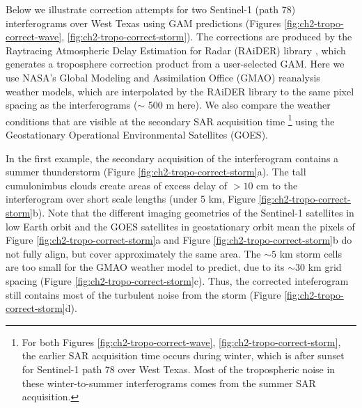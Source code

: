 Below we illustrate correction attempts for two Sentinel-1 (path 78) interferograms over West Texas using GAM predictions (Figures \ref{fig:ch2-tropo-correct-wave}, \ref{fig:ch2-tropo-correct-storm}). 
The corrections are produced by the Raytracing Atmospheric Delay Estimation for Radar (RAiDER) library \citep{Maurer2021RaiderRaytracingAtmospheric}, which generates a troposphere correction product from a user-selected GAM. Here we use NASA's Global Modeling and Assimilation Office (GMAO) reanalysis weather models, which are interpolated by the RAiDER library to the same pixel spacing as the interferograms ($\sim$ 500 m here). We also compare the weather conditions that are visible at the secondary SAR acquisition time \footnote{For both Figures \ref{fig:ch2-tropo-correct-wave}, \ref{fig:ch2-tropo-correct-storm}, the earlier SAR acquisition time occurs during winter, which is after sunset for Sentinel-1 path 78 over West Texas. Most of the tropospheric noise in these winter-to-summer interferograms comes from the summer SAR acquisition.} using the Geostationary Operational Environmental Satellites (GOES).

In the first example, the secondary acquisition of the interferogram contains a summer thunderstorm (Figure \ref{fig:ch2-tropo-correct-storm}a). The tall cumulonimbus clouds create areas of excess delay of $>10$ cm to the interferogram over short scale lengths (under 5 km, Figure \ref{fig:ch2-tropo-correct-storm}b). 
Note that the different imaging geometries of the Sentinel-1 satellites in low Earth orbit and the GOES satellites in geostationary orbit mean the pixels of Figure \ref{fig:ch2-tropo-correct-storm}a and Figure \ref{fig:ch2-tropo-correct-storm}b do not fully align, but cover approximately the same area.
The $\sim 5$ km storm cells are too small for the GMAO weather model to predict, due to its $\sim30$ km grid spacing (Figure \ref{fig:ch2-tropo-correct-storm}c). Thus, the corrected inteferogram still contains most of the turbulent noise from the storm (Figure \ref{fig:ch2-tropo-correct-storm}d).

